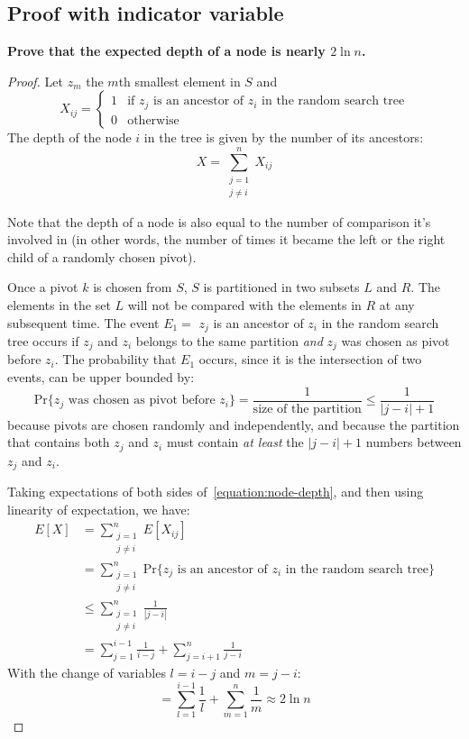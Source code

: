 \documentclass{article}
\begin{document}
\subsection{Proof with indicator variable}

\textbf{Prove that the expected depth of a node is nearly $2 \ln n$.}

\begin{proof}
  Let $z_m$ the $m$th smallest element in $S$ and $$X_{ij}=
  \left\{
    \begin{array}{ll}
      1 & \mbox{if $z_j$ is an ancestor of $z_i$ in the random search tree} \\
      0 & \mbox{otherwise}
    \end{array}
  \right.$$
  The depth of the node $i$ in the tree is given by the number of its ancestors:
  \begin{equation}
    X=\sum_{\substack{j=1 \\ j\ne i}}^n X_{ij}
    \label{equation:node-depth}
  \end{equation}

  Note that the depth of a node is also equal to the number of comparison it's
  involved in (in other words, the number of times it became the left or the
  right child of a randomly chosen pivot).

  Once a pivot $k$ is chosen from $S$, $S$ is partitioned in two subsets $L$ and
  $R$. The elements in the set $L$ will not be compared with the elements in $R$
  at any subsequent time. The event $E_1=$ $z_j$ is an ancestor of $z_i$ in the
  random search tree occurs if $z_j$ and $z_i$ belongs to the same partition
  \emph{and} $z_j$ was chosen as pivot before $z_i$. The probability that $E_1$
  occurs, since it is the intersection of two events, can be upper bounded by:
  $$\text{Pr}\{ z_j \text{ was chosen as pivot before } z_i
  \}=\frac{1}{\text{size of the partition}}\leq\frac{1}{|j-i|+1}$$ because
  pivots are chosen randomly and independently, and because the partition that
  contains both $z_j$ and $z_i$ must contain \emph{at least} the $|j-i|+1$
  numbers between $z_j$ and $z_i$.

  Taking expectations of both sides of~\eqref{equation:node-depth}, and then
  using linearity of expectation, we have:
  \begin{align*}
    E[X] & = \sum_{\substack{j=1\\ j\ne i}}^n E[X_{ij}] \\
    & = \sum_{\substack{j=1\\ j\ne i}}^n \text{Pr}\{ z_j \text{ is an ancestor
      of } z_i \text{ in the random search tree} \} \\
    & \le \sum_{\substack{j=1\\ j\ne i}}^n \frac{1}{|j-i|} \\
    & = \sum_{j=1}^{i-1} \frac{1}{i-j} + \sum_{j=i+1}^{n} \frac{1}{j-i}
  \end{align*}
  With the change of variables $l=i-j$ and $m=j-i$:
  \begin{equation*}
    = \sum_{l=1}^{i-1} \frac{1}{l} + \sum_{m=1}^{n} \frac{1}{m} \approx 2\ln n
  \end{equation*}

\end{proof}
\end{document}
